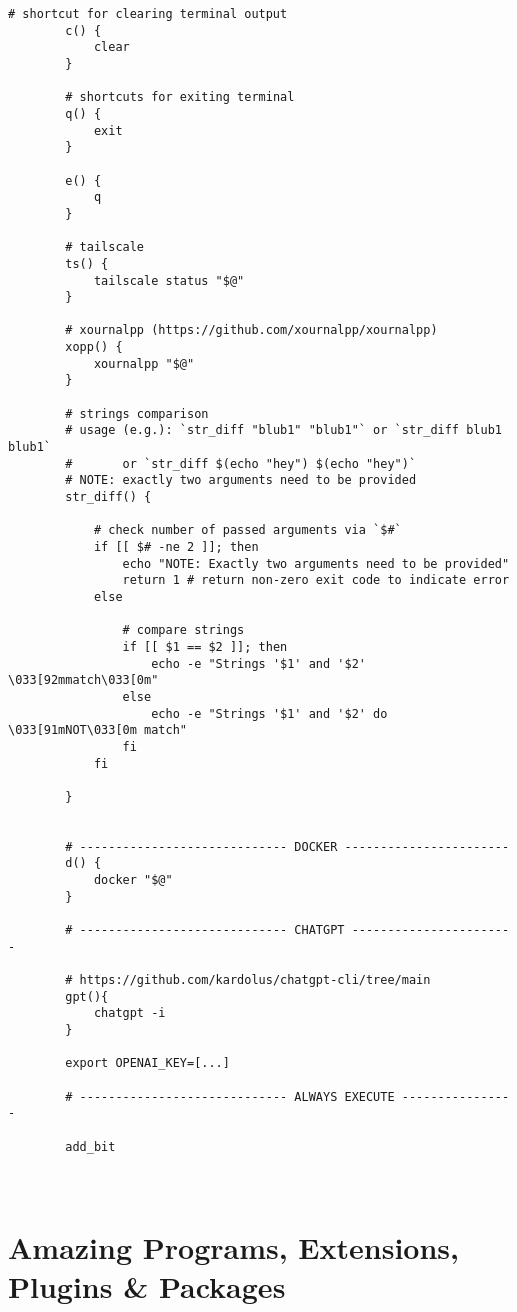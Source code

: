 \documentclass[12pt, a4paper]{scrbook}
\numberwithin{equation}{section}
\theoremstyle{definition}
\theoremstyle{definition}
\begin{document}
\begin{lstlisting}[style=mystylebash, label=alg:bashrc_contents, xleftmargin=\parindent]
		# shortcut for clearing terminal output
		c() {
			clear
		}
		
		# shortcuts for exiting terminal
		q() {
			exit
		}
		
		e() {
			q
		}
	
		# tailscale 
		ts() {
			tailscale status "$@"
		}
	
		# xournalpp (https://github.com/xournalpp/xournalpp)
		xopp() {
			xournalpp "$@"
		}
	
		# strings comparison
		# usage (e.g.): `str_diff "blub1" "blub1"` or `str_diff blub1 blub1`
		#       or `str_diff $(echo "hey") $(echo "hey")`
		# NOTE: exactly two arguments need to be provided
		str_diff() {
			
			# check number of passed arguments via `$#`
			if [[ $# -ne 2 ]]; then
				echo "NOTE: Exactly two arguments need to be provided"
				return 1 # return non-zero exit code to indicate error
			else
			
				# compare strings
				if [[ $1 == $2 ]]; then
					echo -e "Strings '$1' and '$2' \033[92mmatch\033[0m"
				else
					echo -e "Strings '$1' and '$2' do \033[91mNOT\033[0m match"
				fi
			fi
			
		}
		

		# ----------------------------- DOCKER -----------------------
		d() {
			docker "$@"
		}
	
		# ----------------------------- CHATGPT -----------------------

		# https://github.com/kardolus/chatgpt-cli/tree/main
		gpt(){
			chatgpt -i
		}
	
		export OPENAI_KEY=[...]
	
		# ----------------------------- ALWAYS EXECUTE ----------------
		
		add_bit
		
				
	\end{lstlisting}

\chapter{Amazing Programs, Extensions, Plugins \& Packages}
\end{document}
